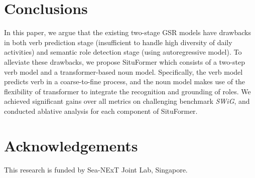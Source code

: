 \documentclass[letterpaper]{article} %
\begin{document}


\section{Conclusions}
In this paper, we argue that the existing two-stage GSR models have drawbacks in both verb prediction stage (insufficient to handle high diversity of daily activities) and semantic role detection stage (using autoregressive model). To alleviate these drawbacks, we propose 
SituFormer which consists of a two-step verb model and a transformer-based noun model. Specifically, the verb model predicts verb in a coarse-to-fine process, and the noun model makes use of the flexibility of transformer to integrate the recognition and grounding of roles. We achieved significant gains over all metrics on challenging benchmark \textit{SWiG}, and conducted ablative analysis for each component of SituFormer.

\section{Acknowledgements}
This research is funded by Sea-NExT Joint Lab, Singapore.



\end{document}
